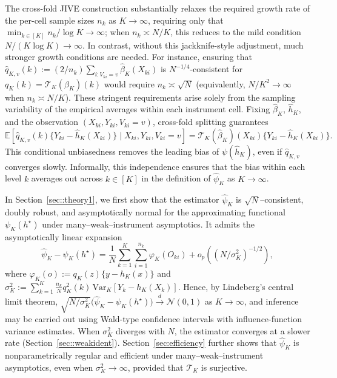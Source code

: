 \documentclass[11pt]{article}
\theoremstyle{plain}
\theoremstyle{definition}
\theoremstyle{remark}
\theoremstyle{definition}
\begin{document}
The cross-fold JIVE construction substantially relaxes the required growth rate
of the per-cell sample sizes \(n_k\) as \(K \to \infty\), requiring only that
\(\min_{k \in [K]} n_k / \log K \to \infty\); when \(n_k \asymp N/K\), this
reduces to the mild condition \(N/(K \log K) \to \infty\). In contrast, without
this jackknife-style adjustment, much stronger growth conditions are needed.
For instance, ensuring that
\(\widehat{q}_{K,v}(k) := (2/n_k)\sum_{i:V_{ki}=v}\widehat{\beta}_K(X_{ki})\)
is \(N^{-1/4}\)-consistent for \(q_K(k) = \mathcal{T}_K(\beta_K)(k)\) would
require \(n_k \asymp \sqrt{N}\) (equivalently, \(N/K^{2} \to \infty\) when
\(n_k \asymp N/K\)). These stringent requirements arise solely from the sampling
variability of the empirical averages within each instrument cell. Fixing \(\widehat{\beta}_K\), \(\widehat{h}_K\), and the observation
\((X_{ki},Y_{ki},V_{ki}=v)\), cross-fold splitting guarantees $
\mathbb{E}\!\left[\widehat{q}_{K,v}(k)\{Y_{ki}-\widehat{h}_K(X_{ki})\}
\mid X_{ki},Y_{ki},V_{ki}=v\right]
= \mathcal{T}_K(\widehat{\beta}_K)(X_{ki})\{Y_{ki}-\widehat{h}_K(X_{ki})\}.$
This conditional unbiasedness removes the leading bias of
\(\psi(\widehat{h}_K)\), even if \(\widehat{q}_{K,v}\) converges slowly.
Informally, this independence ensures that the bias within each level \(k\)
averages out across \(k \in [K]\) in the definition of \(\widehat{\psi}_K\) as
\(K \to \infty\).




 



In Section~\ref{sec::theory1}, we first show that the estimator
$\widehat{\psi}_K$ is $\sqrt{N}$–consistent, doubly robust, and asymptotically
normal for the approximating functional $\psi_K(h^\star)$ under
many--weak--instrument asymptotics. It admits the asymptotically linear
expansion
\[
\widehat{\psi}_K - \psi_K(h^\star)
= \frac{1}{N}\sum_{k=1}^K \sum_{i=1}^{n_k} \varphi_K(O_{ki})
+ o_p\!\left((N/\sigma_K^2)^{-1/2}\right),
\]
where $\varphi_K(o) := q_K(z)\{y - h_K(x)\}$ and
$\sigma_K^2 := \sum_{k=1}^K \tfrac{n_k}{N} q_K^2(k)\,
\mathrm{Var}_K[Y_k - h_K(X_k)]$.  
Hence, by Lindeberg’s central limit theorem,
$\sqrt{N/\sigma_K^2}\big(\widehat{\psi}_K - \psi_K(h^\star)\big)
\overset{d}\to \mathcal{N}(0,1)$ as $K\to\infty$, and inference may be carried
out using Wald-type confidence intervals with influence-function variance
estimates. When $\sigma_K^2$ diverges with $N$, the estimator converges at a
slower rate (Section~\ref{sec::weakident}). Section~\ref{sec:efficiency} further shows that
$\widehat{\psi}_K$ is nonparametrically regular and efficient under
many--weak--instrument asymptotics, even when $\sigma_K^{2}\to\infty$, provided
that $\mathcal{T}_K$ is surjective.
\end{document}

